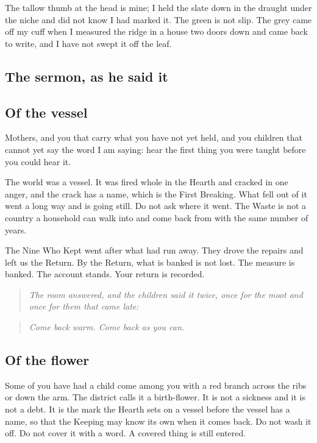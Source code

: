 \documentclass{design/chronicle}
\begin{document}
The tallow thumb at the head is mine; I held the slate down in the draught under the niche and did not know I had marked it. The green is not slip. The grey came off my cuff when I measured the ridge in a house two doors down and came back to write, and I have not swept it off the leaf.

\subsection*{The sermon, as he said it}

\subsection*{Of the vessel}

Mothers, and you that carry what you have not yet held, and you children that cannot yet say the word I am saying: hear the first thing you were taught before you could hear it.

The world was a vessel. It was fired whole in the Hearth and cracked in one anger, and the crack has a name, which is the First Breaking. What fell out of it went a long way and is going still. Do not ask where it went. The Waste is not a country a household can walk into and come back from with the same number of years.

The Nine Who Kept went after what had run away. They drove the repairs and left us the Return. By the Return, what is banked is not lost. The measure is banked. The account stands. Your return is recorded.

\begin{quote}\itshape \emph{The room answered, and the children said it twice, once for the moot and once for them that came late:}\end{quote}

\begin{quote}\itshape \end{quote}

\begin{quote}\itshape Come back warm. Come back as you can.\end{quote}

\subsection*{Of the flower}

Some of you have had a child come among you with a red branch across the ribs or down the arm. The district calls it a birth-flower. It is not a sickness and it is not a debt. It is the mark the Hearth sets on a vessel before the vessel has a name, so that the Keeping may know its own when it comes back. Do not wash it off. Do not cover it with a word. A covered thing is still entered.
\end{document}

